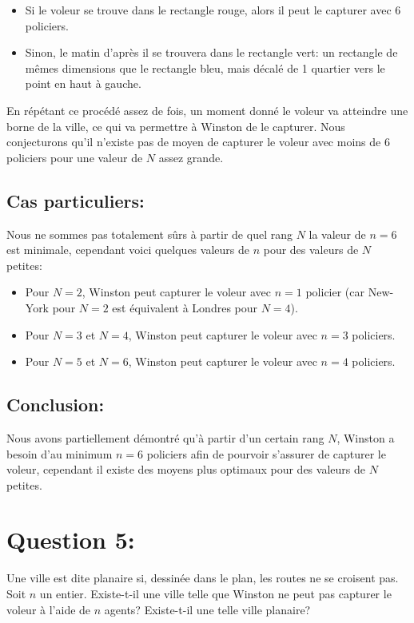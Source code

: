\begin{itemize}
    \item Si le voleur se trouve dans le rectangle rouge, alors il peut le capturer avec 6 policiers.
    \item Sinon, le matin d'après il se trouvera dans le rectangle vert: un rectangle de mêmes dimensions que le rectangle bleu, mais décalé de 1 quartier vers le point en haut à gauche.
\end{itemize}


\medskip

En répétant ce procédé assez de fois, un moment donné le voleur va atteindre une borne de la ville, ce qui va permettre à Winston de le capturer. Nous conjecturons qu'il n'existe pas de moyen de capturer le voleur avec moins de 6 policiers pour une valeur de $N$ assez grande.

\subsection{Cas particuliers:}
Nous ne sommes pas totalement sûrs à partir de quel rang $N$ la valeur de $n=6$ est minimale, cependant voici quelques valeurs de $n$ pour des valeurs de $N$ petites:
\begin{itemize}
    \item Pour $N=2$, Winston peut capturer le voleur avec $n=1$ policier (car New-York pour $N=2$ est équivalent à Londres pour $N=4$).
    \item Pour $N=3$ et $N=4$, Winston peut capturer le voleur avec $n=3$ policiers.
    \item Pour $N=5$ et $N=6$, Winston peut capturer le voleur avec $n=4$ policiers.
\end{itemize}

\subsection{Conclusion:}

Nous avons partiellement démontré qu'à partir d'un certain rang $N$, Winston a besoin d'au minimum $n=6$ policiers afin de pourvoir s'assurer de capturer le voleur, cependant il existe des moyens plus optimaux pour des valeurs de $N$ petites.
\section{Question 5:}
\begin{enonce}
Une ville est dite planaire si, dessinée dans le plan, les routes ne se croisent pas. Soit $n$ un entier. Existe-t-il une ville telle que Winston ne peut pas capturer le voleur à l'aide de $n$ agents? Existe-t-il une telle ville planaire?
\end{enonce}
